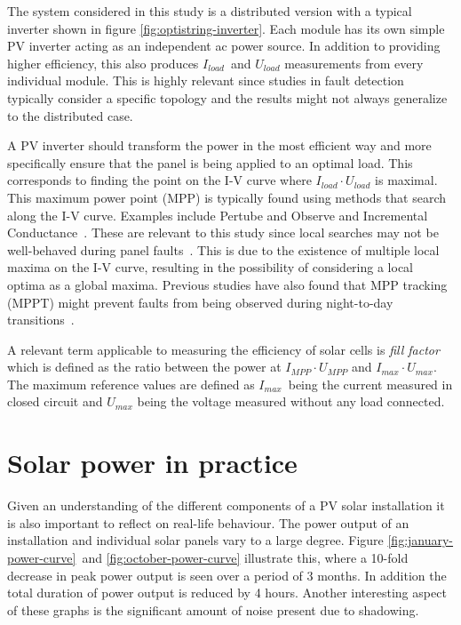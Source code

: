 
The system considered in this study is a distributed version with a typical inverter shown in figure \ref{fig:optistring-inverter}.
Each module has its own simple PV inverter acting as an independent ac power source.
In addition to providing higher efficiency, this also produces $I_{load}$ and $U_{load}$ measurements from every individual module.
This is highly relevant since studies in fault detection typically consider a specific topology and the results might not always generalize to the distributed case.

A PV inverter should transform the power in the most efficient way and more specifically ensure that the panel is being applied to an optimal load.
This corresponds to finding the point on the I-V curve where $I_{load} \cdot U_{load}$ is maximal.
This maximum power point (MPP) is typically found using methods that search along the I-V curve.
Examples include Pertube and Observe and Incremental Conductance~\cite{Roman2006}.
These are relevant to this study since local searches may not be well-behaved during panel faults~\cite{Roman2006}.
This is due to the existence of multiple local maxima on the I-V curve, resulting in the possibility of considering a local optima as a global maxima.
Previous studies have also found that MPP tracking (MPPT) might prevent faults from being observed during night-to-day transitions~\cite{Zhao2010night}.

A relevant term applicable to measuring the efficiency of solar cells is \emph{fill factor} which is defined as the ratio between the power at $I_{MPP} \cdot U_{MPP}$ and $I_{max} \cdot U_{max}$.
The maximum reference values are defined as $I_{max}$ being the current measured in closed circuit and $U_{max}$ being the voltage measured without any load connected.


\section{Solar power in practice}
Given an understanding of the different components of a PV solar installation it is also important to reflect on real-life behaviour.
The power output of an installation and individual solar panels vary to a large degree.
Figure \ref{fig:january-power-curve} and \ref{fig:october-power-curve} illustrate this, where a 10-fold decrease in peak power output is seen over a period of 3 months.
In addition the total duration of power output is reduced by 4 hours.
Another interesting aspect of these graphs is the significant amount of noise present due to shadowing.

